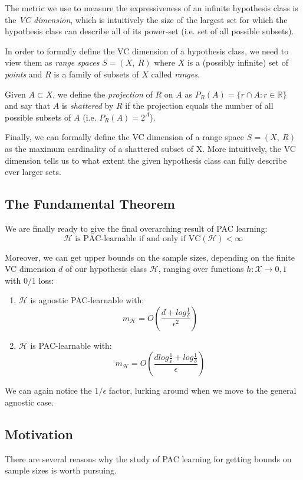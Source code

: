 \documentclass[11pt]{sigplanconf}
\renewcommand\it{\textit}
\renewcommand\H{\mathcal{H}}
\newcommand\X{\mathcal{X}}
\newcommand\R{\mathds{R}}
\begin{document}
The metric we use to measure the expressiveness of an infinite hypothesis class is the \it{VC dimension}, which is intuitively the size of the largest set for which the hypothesis class can describe all of its power-set (i.e. set of all possible subsets).

In order to formally define the VC dimension of a hypothesis class, we need to view them as \it{range spaces} $S=(X,\ R)$ where $X$ is a (possibly infinite) set of \it{points} and $R$ is a family of subsets of $X$ called \it{ranges}.

Given $A \subset X$, we define the \it{projection} of $R$ on $A$ as
$P_R(A) = \{ r \cap A : r \in \R \}$ and say that $A$ is \it{shattered} by $R$ if the projection equals the number of all possible subsets of $A$ (i.e. $P_R(A) = 2^A$).

Finally, we can formally define the VC dimension of a range space $S=(X,\ R)$ as the maximum cardinality of a shattered subset of X. More intuitively, the VC dimension tells us to what extent the given hypothesis class can fully describe ever larger sets.

\subsection{The Fundamental Theorem}
We are finally ready to give the final overarching result of PAC learning:\\
\[ \H \text{ is PAC-learnable if and only if VC} (\H) < \infty
\]

Moreover, we can get upper bounds on the sample sizes, depending on the finite VC dimension $d$ of our hypothesis class $\H$, ranging over functions $h : \X \to {0,1}$ with $0/1$ loss:
\begin{enumerate}
\item $\H$ is agnostic PAC-learnable with:
\[ m_\H = O(\frac{d + log\frac{1}{\delta}}{\epsilon^2})
\]
\item $\H$ is PAC-learnable with:
\[ m_\H = O(\frac{dlog\frac{1}{\epsilon} + log\frac{1}{\delta}}{\epsilon})
\]
\end{enumerate}
We can again notice the $1/\epsilon$ factor, lurking around when we move to the general agnostic case.

\subsection{Motivation}
There are several reasons why the study of PAC learning for getting bounds on sample sizes is worth pursuing.
\end{document}
